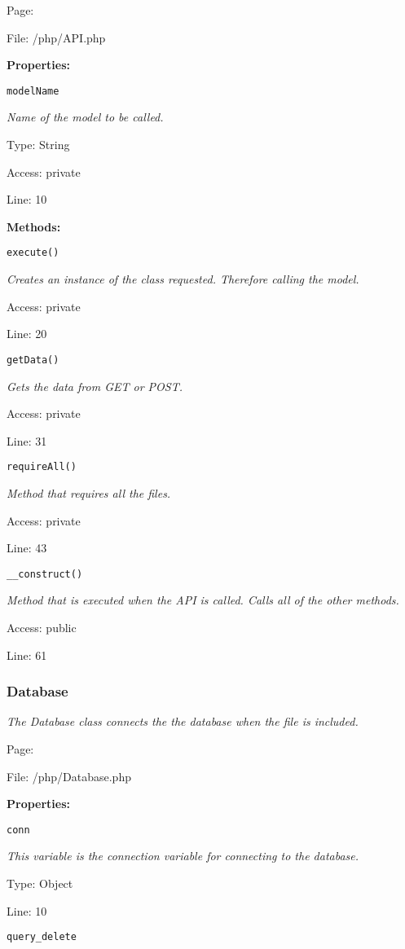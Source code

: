 Page: \pageref{API.php}

File: /php/API.php

\textbf{Properties:}

\texttt{modelName}

{\scriptsize
\textit{Name of the model to be called.}

Type: String

Access: private

Line: 10

}
\textbf{Methods:}

\texttt{execute()}

{\scriptsize
\textit{Creates an instance of the class requested.
Therefore calling the model.}

Access: private

Line: 20

}

\texttt{getData()}

{\scriptsize
\textit{Gets the data from GET or POST.}

Access: private

Line: 31

}

\texttt{requireAll()}

{\scriptsize
\textit{Method that requires all the files.}

Access: private

Line: 43

}

\texttt{\_\_construct()}

{\scriptsize
\textit{Method that is executed when the API is called.
Calls all of the other methods.}

Access: public

Line: 61

}

\subsubsection{Database}\label{Database.php.doc}
\textit{The Database class connects the the database when the file is included.}

Page: \pageref{Database.php}

File: /php/Database.php

\textbf{Properties:}

\texttt{conn}

{\scriptsize
\textit{This variable is the connection variable for connecting to the database.}

Type: Object

Line: 10

}
\texttt{query\_delete}

